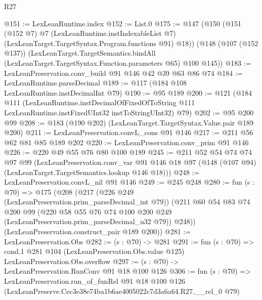 \begin{lexlean}{R27}
\begin{coremodule}
@151 := LexLeanRuntime.index
@152 := List.{0}
@175 := @147
    (@150
      (@151
        (@152 @7)
        @7
        (LexLeanRuntime.instIndexableList @7)
        (LexLeanTarget.TargetSyntax.Program.functions @91)
        @18))
    (@148
      (@107 (@152 @137))
      (LexLeanTarget.TargetSemantics.bindAll
        (LexLeanTarget.TargetSyntax.Function.parameters @65)
        @100
        @145))
@183 := LexLeanPreservation.conv_build @91 @146 @42 @39 @63 @86 @74
@184 := LexLeanRuntime.parseDecimal
@189 := @117 (@184 @108 LexLeanRuntime.instDecimalInt @79)
@190 := @95 @189
@200 := @121
    (@184
      @111
      (LexLeanRuntime.instDecimalOfFixedOfToString
        @111
        LexLeanRuntime.instFixedUInt32
        instToStringUInt32)
      @79)
@202 := @95 @200 @99
@208 := @183 (@190 @202) (LexLeanTarget.TargetSyntax.Value.pair @189 @200)
@211 := LexLeanPreservation.convL_cons @91 @146
@217 := @211 @56 @62 @81 @85 @189 @202
@220 := LexLeanPreservation.conv_prim @91 @146
@226 := @220 @49 @55 @76 @80 @100 @189
@245 := @211
    @52
    @54
    @74
    @74
    @97
    @99
    (LexLeanPreservation.conv_var
      @91
      @146
      @18
      @97
      (@148 (@107 @94) (LexLeanTarget.TargetSemantics.lookup @146 @18)))
@248 := LexLeanPreservation.convL_nil @91 @146
@249 := @245 @248
@280 := fun (s : @70) =>
  @175
    (@208
      (@217
        (@226 @249 (LexLeanPreservation.prim_parseDecimal_int @79))
        (@211
          @60
          @54
          @83
          @74
          @200
          @99
          (@220 @58 @55 @76 @74 @100 @200 @249 (LexLeanPreservation.prim_parseDecimal_u32 @79))
          @248))
      (LexLeanPreservation.construct_pair @189 @200))
@281 := LexLeanPreservation.Obs
@282 := (s : @70) -> @281
@291 := fun (s : @70) =>
  cond.{1} @281 @104 (LexLeanPreservation.Obs.value @125) LexLeanPreservation.Obs.overflow
@297 := (s : @70) -> LexLeanPreservation.RunConv @91 @18 @100 @126
@306 := fun (s : @70) =>
  LexLeanPreservation.run_of_funRel
    @91
    @18
    @100
    @126
    (LexLeanPreserve.Cec3e38e74ba1b6ae4005022c7d3a6a64.R27.__rel_0 @79)
\end{coremodule}
\end{lexlean}
